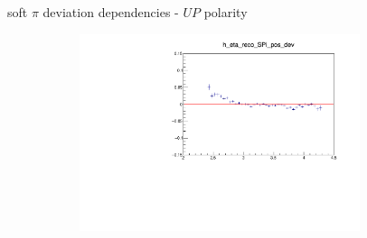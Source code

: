 \documentclass[11pt]{beamer}
\begin{document}
\begin{frame}{soft $\pi$ deviation dependencies - $UP$ polarity}
\begin{figure}
\begin{subfigure}{0.45\textwidth}
\end{subfigure}
\begin{subfigure}{0.45\textwidth}
\includegraphics[width=0.9\textwidth]{fourth/up_pdf/deviation/h_eta_reco_SPi_pos_dev.pdf}
\end{subfigure}
\end{figure}
\end{frame}
\end{document}
